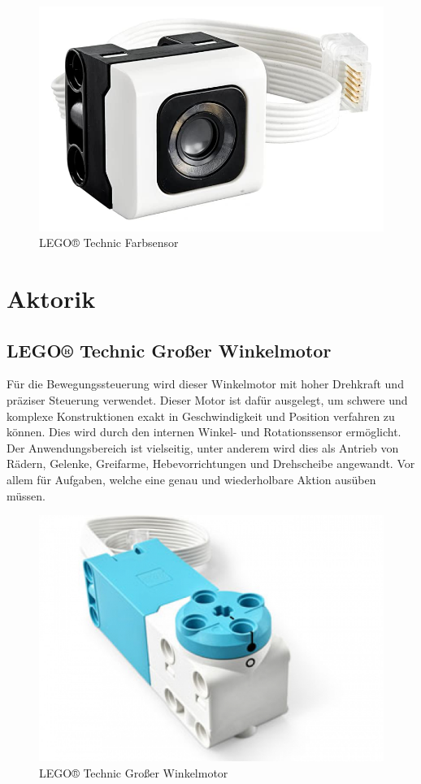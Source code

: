 \begin{figure}[H]
	\centering
	\includegraphics[width=0.4\linewidth]{images/Farbsensor}
	\caption{LEGO® Technic Farbsensor}
	\label{fig:farbsensor}
\end{figure}


\section{Aktorik}
\subsection{LEGO® Technic Großer Winkelmotor}
Für die Bewegungssteuerung wird dieser Winkelmotor mit hoher Drehkraft und präziser Steuerung verwendet. Dieser Motor ist dafür ausgelegt, um schwere und komplexe Konstruktionen exakt in Geschwindigkeit und Position verfahren zu können. Dies wird durch den internen Winkel- und Rotationssensor ermöglicht. Der Anwendungsbereich ist vielseitig, unter anderem wird dies als Antrieb von Rädern, Gelenke, Greifarme, Hebevorrichtungen und Drehscheibe angewandt. Vor allem für Aufgaben, welche eine genau und wiederholbare Aktion ausüben müssen.

\begin{figure}[H]
	\centering
	\includegraphics[width=0.4\linewidth]{images/Motor}
	\caption{LEGO® Technic Großer Winkelmotor}
	\label{fig:motor}
\end{figure}
